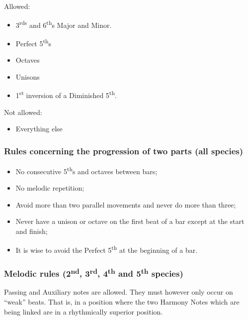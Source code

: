 \documentclass{article}
\begin{document}
Allowed:
\begin{itemize}
    \item 3\textsuperscript{rds} and 6\textsuperscript{th}s Major and Minor.
    \item Perfect 5\textsuperscript{th}s
    \item Octaves
    \item Unisons
    \item 1\textsuperscript{st} inversion of a Diminished 5\textsuperscript{th}.
\end{itemize}

Not allowed:
\begin{itemize}
    \item Everything else
\end{itemize}

\subsubsection{Rules concerning the progression of two parts (all species)}

\begin{itemize}
    \item No consecutive 5\textsuperscript{th}s and octaves between bars;
    \item No melodic repetition;
    \item Avoid more than two parallel movements and never do more than three;\footnotemark
    \item Never have a unison or octave on the first beat of a bar except at the start and finish;
    \item It is wise to avoid the Perfect 5\textsuperscript{th} at the beginning of a bar.
\end{itemize}


\subsubsection{Melodic rules (2\textsuperscript{nd}, 3\textsuperscript{rd}, 4\textsuperscript{th} and 5\textsuperscript{th} species)}

Passing and Auxiliary notes are allowed.
They must however only occur on ``weak'' beats.
That is, in a position where the two Harmony Notes which are being linked are in a rhythmically superior position.
\end{document}
